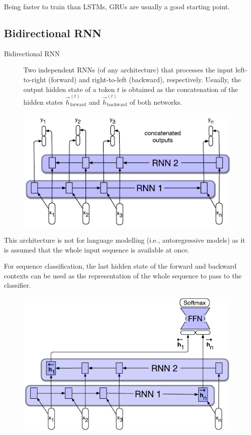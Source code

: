 \begin{remark}
    Being faster to train than LSTMs, GRUs are usually a good starting point.
\end{remark}


\subsection{Bidirectional RNN}

\begin{description}
    \item[Bidirectional RNN] 
        Two independent RNNs (of any architecture) that processes the input left-to-right (forward) and right-to-left (backward), respectively. Usually, the output hidden state of a token $t$ is obtained as the concatenation of the hidden states $\vec{h}^{(t)}_{\text{forward}}$ and $\vec{h}^{(t)}_{\text{backward}}$ of both networks.
\end{description}

\begin{figure}[H]
    \centering
    \includegraphics[width=0.45\linewidth]{./img/_birnn.pdf}
\end{figure}

\begin{remark}
    This architecture is not for language modelling (i.e., autoregressive models) as it is assumed that the whole input sequence is available at once.
\end{remark}

\begin{example}
    For sequence classification, the last hidden state of the forward and backward contexts can be used as the representation of the whole sequence to pass to the classifier.

    \begin{figure}[H]
        \centering
        \includegraphics[width=0.35\linewidth]{./img/_birnn_seq_classification.pdf}
    \end{figure}
\end{example}


